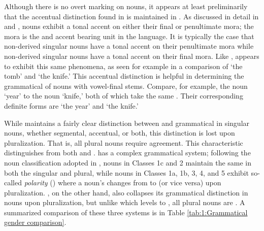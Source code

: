 \documentclass[output=paper]{../langsci/langscibook}
\begin{document}
Although there is no overt  marking on  nouns, it appears at least preliminarily that the accentual  distinction found in  is maintained in . As discussed in detail in \citet{Hyman1981somali} and \citet{GreenMorrison2016},  nouns exhibit a tonal accent on either their final or penultimate mora; the mora is the  and accent bearing unit in the language. It is typically the case that non-derived  singular nouns have a tonal accent on their penultimate mora while non-derived  singular nouns have a tonal accent on their final mora. Like ,  appears to exhibit this same phenomena, as seen for example in a comparison of   `the tomb' and   `the knife.' This accentual distinction is helpful in determining the grammatical  of nouns with vowel-final stems. Compare, for example, the  noun  `year' to the  noun  `knife,' both of which take the same  . Their corresponding definite forms are  `the year' and  `the knife.'
 
 While  maintains a fairly clear distinction between  and  grammatical  in singular nouns, whether segmental, accentual, or both, this distinction is lost upon pluralization. That is, all plural nouns require   agreement. This characteristic distinguishes  from both  and .  has a complex grammatical  system; following the noun classification adopted in \citet{Greenetal2015}, nouns in Classes 1c and 2 maintain the same  in both the singular and plural, while nouns in Classes 1a, 1b, 3, 4, and 5 exhibit so-called \textit{ polarity} (\citealt{Meinhof1912}) where a noun's  changes from  to  (or vice versa) upon pluralization. , on the other hand, also collapses its grammatical  distinction in nouns upon pluralization, but unlike  which levels  to , all  plural nouns are . A summarized comparison of these three systems is in Table \ref{tab:1:Grammatical gender comparison}. 
 
\end{document}
